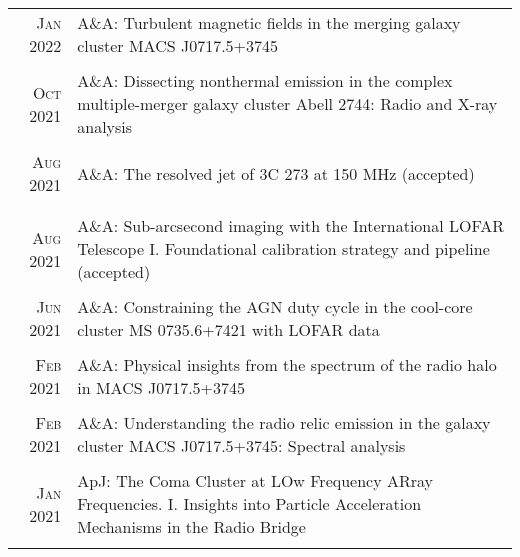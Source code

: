 \documentclass[11pt,a4paper,notitlepage]{article}
\begin{document}
\begin{tabular}{r|p{12.5cm}}
	
%	
	\textsc{Jan 2022} & A\&A: Turbulent magnetic fields in the merging galaxy cluster MACS J0717.5+3745 \citep{2022AA...657A...2R} \\
	\multicolumn{2}{c}{} \\

	\textsc{Oct 2021} & A\&A: Dissecting nonthermal emission in the complex multiple-merger galaxy cluster Abell 2744: Radio and X-ray analysis \citep{2021AA...654A..41R} \\
	\multicolumn{2}{c}{} \\

	\textsc{Aug 2021} & A\&A: The resolved jet of 3C 273 at 150 MHz (accepted) \\
	\multicolumn{2}{c}{} \\

	\multicolumn{2}{c}{} \\	\textsc{Aug 2021} & A\&A: Sub-arcsecond imaging with the International LOFAR Telescope I. Foundational calibration strategy and pipeline (accepted) \\
	\multicolumn{2}{c}{} \\
	
	\textsc{Jun 2021} & A\&A: Constraining the AGN duty cycle in the cool-core cluster MS 0735.6+7421 with LOFAR data
	 \citep{2021AA...650A.170B} \\
	\multicolumn{2}{c}{} \\


	\textsc{Feb 2021} & A\&A: Physical insights from the spectrum of the radio halo in MACS J0717.5+3745 \citep{2021AA...646A.135R} \\
	\multicolumn{2}{c}{} \\
	
	\textsc{Feb 2021} & A\&A: Understanding the radio relic emission in the galaxy cluster MACS J0717.5+3745: Spectral analysis \citep{2021AA...646A..56R} \\
	\multicolumn{2}{c}{} \\
	
	\textsc{Jan 2021} & ApJ: The Coma Cluster at LOw Frequency ARray Frequencies. I. Insights into Particle Acceleration Mechanisms in the Radio Bridge \citep{2021ApJ...907...32B} \\
	\multicolumn{2}{c}{} \\

\end{tabular}
\end{document}
